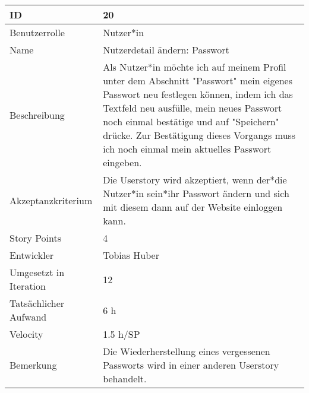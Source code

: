 \begin{tabularx}{\textwidth}{|p{}|X|}
	\hline
	ID & 20\\
	\hline
	Benutzerrolle & Nutzer*in\\
	\hline
	Name & Nutzerdetail ändern: Passwort\\
	\hline
	Beschreibung & Als Nutzer*in möchte ich auf meinem Profil unter dem Abschnitt "Passwort" mein eigenes Passwort neu festlegen können, indem ich das Textfeld neu ausfülle, mein neues Passwort noch einmal bestätige und auf "Speichern" drücke. Zur Bestätigung dieses Vorgangs muss ich noch einmal mein aktuelles Passwort eingeben.\\
	\hline
	Akzeptanzkriterium & Die Userstory wird akzeptiert, wenn der*die Nutzer*in sein*ihr Passwort ändern und sich mit diesem dann auf der Website einloggen kann.\\
	\hline
	Story Points & 4\\
	\hline
	Entwickler & Tobias Huber\\
	\hline
	Umgesetzt in Iteration & 12\\ 
	\hline
	Tatsächlicher Aufwand & 6 h\\
	\hline
	Velocity & 1.5 h/SP\\
	\hline
	Bemerkung & Die Wiederherstellung eines vergessenen Passworts wird in einer anderen Userstory behandelt.\\
	\hline
\end{tabularx}
\vspace{20pt}
